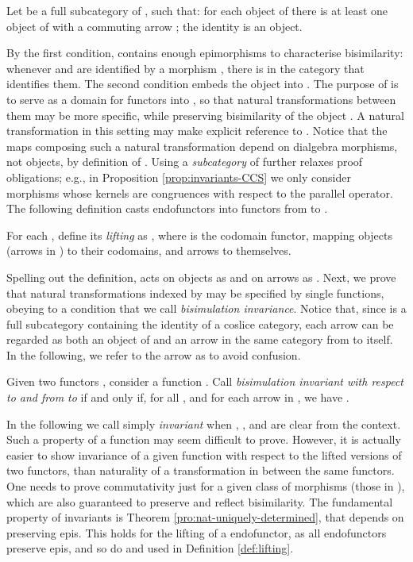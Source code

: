 \documentclass[orivec]{llncs}
\newcommand{\defend}{}
\renewenvironment{definition}{\begin{defn}}{\defend\end{defn}}
\begin{document}
\begin{definition}\label{def:reach}
	Let  be a full subcategory of , such that:
for each object  of  there is at least one object  of  with a commuting arrow ;
the identity  is an object.
\end{definition}


By the first condition,  contains enough epimorphisms to characterise bisimilarity: whenever  and  are identified by a morphism , there is  in the category that identifies them. The second condition embeds the object  into . The purpose of  is to serve as a domain for functors into , so that natural transformations between them may be more specific, while preserving bisimilarity of the object . A natural transformation in this setting may make explicit reference to . Notice that the maps composing such a natural transformation depend on dialgebra morphisms, not objects, by definition of . Using a \emph{subcategory} of  further relaxes proof obligations; e.g., in Proposition \ref{prop:invariants-CCS} we only consider morphisms whose kernels are congruences with respect to the parallel operator. 
The following definition casts  endofunctors into functors from  to .
\begin{definition}\label{def:lifting} For each , define its \emph{lifting}  as , where  is the codomain functor, mapping objects (arrows in ) to their codomains, and arrows to themselves.
\end{definition}

Spelling out the definition,  acts on objects as  and on arrows as . 
Next, we prove that natural transformations indexed by  may be specified by single functions, obeying to a condition that we call \emph{bisimulation invariance}. Notice that, since  is a full subcategory containing the identity of a coslice category, each arrow  can be regarded as both an object of  and an arrow in the same category from  to  itself. In the following, we refer to the arrow as  to avoid confusion.
\begin{definition}\label{def:invariant}
Given two functors , consider a function . Call  \emph{bisimulation invariant with respect to  and  from   to } if and only if, for all  , and for each arrow  in , we have . 
\end{definition}

In the following we call  simply \emph{invariant} when , ,  and  are clear from the context. Such a property of a function may seem difficult to prove. However, it is actually easier to show invariance of a given function with respect to the lifted versions of two functors, than naturality of a transformation in  between the same functors. One needs to prove commutativity just for a given class of morphisms (those in ), which are also guaranteed to preserve and reflect bisimilarity. The fundamental property of invariants is Theorem \ref{pro:nat-uniquely-determined}, that depends on  preserving epis. This holds for the lifting  of a  endofunctor, as all  endofunctors preserve epis, and so do  and  used in Definition \ref{def:lifting}. 
\end{document}
